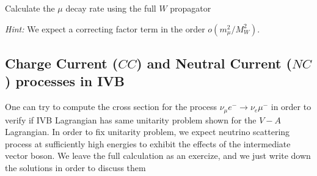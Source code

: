\documentclass[TheoreticalPhy_ModB.tex]{subfiles}
\begin{document}
\begin{exercise}
Calculate the $\mu$ decay rate using the full $W$ propagator

\textit{Hint:} We expect a correcting factor term in the order $o(m_\mu^2/M_W^2)$.
\end{exercise}

\subsection{Charge Current ($CC$) and Neutral Current ($NC$) processes in IVB}

One can try to compute the cross section for the process $\nu_\mu e^-\to\nu_e\mu^-$ in order to verify if IVB Lagrangian has same unitarity problem shown for the $V-A$ Lagrangian. In order to fix unitarity problem, we expect neutrino scattering process at sufficiently high energies to exhibit the effects of the intermediate vector boson. We leave the full calculation as an exercize, and we just write down the solutions in order to discuss them
\end{document}
